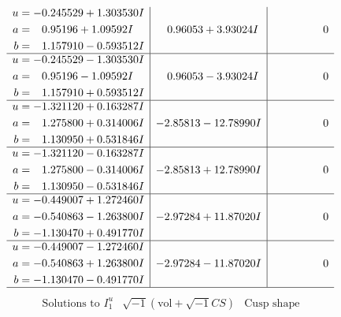 \documentclass[1p]{elsarticle_modified}
\theoremstyle{definition}
\newcommand{\I}{\sqrt{-1}}
\begin{document}
$$\begin{array}{c|c|c}
\begin{aligned}
u &= -0.245529 + 1.303530 I \\
a &= \phantom{-}0.95196 + 1.09592 I \\
b &= \phantom{-}1.157910 - 0.593512 I\end{aligned}
 & \phantom{-}0.96053 + 3.93024 I & \phantom{-0.000000 } 0 \\ \hline\begin{aligned}
u &= -0.245529 - 1.303530 I \\
a &= \phantom{-}0.95196 - 1.09592 I \\
b &= \phantom{-}1.157910 + 0.593512 I\end{aligned}
 & \phantom{-}0.96053 - 3.93024 I & \phantom{-0.000000 } 0 \\ \hline\begin{aligned}
u &= -1.321120 + 0.163287 I \\
a &= \phantom{-}1.275800 + 0.314006 I \\
b &= \phantom{-}1.130950 + 0.531846 I\end{aligned}
 & -2.85813 - 12.78990 I & \phantom{-0.000000 } 0 \\ \hline\begin{aligned}
u &= -1.321120 - 0.163287 I \\
a &= \phantom{-}1.275800 - 0.314006 I \\
b &= \phantom{-}1.130950 - 0.531846 I\end{aligned}
 & -2.85813 + 12.78990 I & \phantom{-0.000000 } 0 \\ \hline\begin{aligned}
u &= -0.449007 + 1.272460 I \\
a &= -0.540863 - 1.263800 I \\
b &= -1.130470 + 0.491770 I\end{aligned}
 & -2.97284 + 11.87020 I & \phantom{-0.000000 } 0 \\ \hline\begin{aligned}
u &= -0.449007 - 1.272460 I \\
a &= -0.540863 + 1.263800 I \\
b &= -1.130470 - 0.491770 I\end{aligned}
 & -2.97284 - 11.87020 I & \phantom{-0.000000 } 0\\
 \hline 
 \end{array}$$\newpage$$\begin{array}{c|c|c}  
\text{Solutions to }I^u_{1}& \I (\text{vol} + \sqrt{-1}CS) & \text{Cusp shape}\\
 \hline 
\begin{aligned}

\end{aligned}
\end{array}$$
\end{document}
